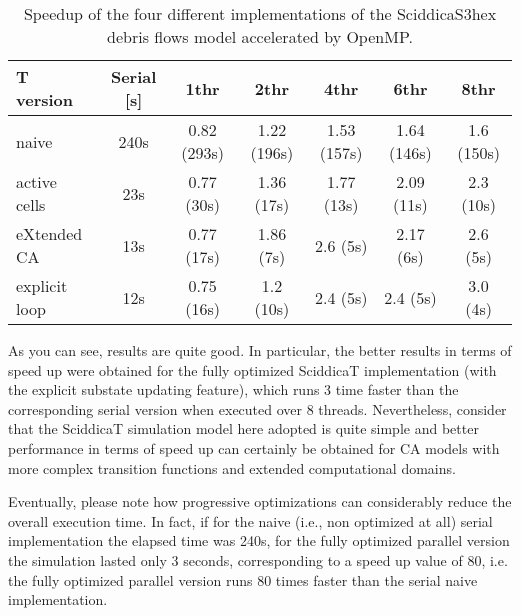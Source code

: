 \begin{table}
  \centering
  \footnotesize
  \begin{tabular}{l|c|c|c|c|c|c}
    \hline
    T version & Serial [s] & 1thr & 2thr & 4thr & 6thr & 8thr\\
    \hline
    \hline
    naive         & 240s & 0.82 (293s) & 1.22 (196s) & 1.53 (157s) & 1.64 (146s) & 1.6 (150s)\\
    active cells  & 23s  & 0.77 (30s)  & 1.36 (17s)  & 1.77 (13s)  & 2.09 (11s)  & 2.3 (10s)\\
    eXtended CA   & 13s  & 0.77 (17s)  & 1.86 (7s)   & 2.6  (5s)   & 2.17  (6s)  & 2.6 (5s)\\
    explicit loop & 12s  & 0.75 (16s)  & 1.2  (10s)  & 2.4  (5s)   & 2.4  (5s)   & 3.0 (4s)\\
    \hline
  \end{tabular}
  \caption{Speedup of the four different
    implementations of the SciddicaS3hex debris flows model accelerated by OpenMP.}
  \label{tab:speedup}
\end{table}

As you can see, results are quite good. In particular, the better
results in terms of speed up were obtained for the fully optimized
SciddicaT implementation (with the explicit substate updating
feature), which runs 3 time faster than the corresponding serial
version when executed over 8 threads. Nevertheless, consider that the
SciddicaT simulation model here adopted is quite simple and better
performance in terms of speed up can certainly be obtained for CA
models with more complex transition functions and extended
computational domains.

Eventually, please note how progressive optimizations can considerably
reduce the overall execution time. In fact, if for the naive (i.e., non
optimized at all) serial implementation the elapsed time was 240s, for
the fully optimized parallel version the simulation lasted only 3
seconds, corresponding to a speed up value of 80, i.e. the fully
optimized parallel version runs 80 times faster than the serial naive
implementation.


